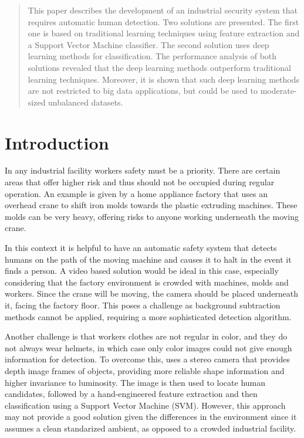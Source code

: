\begin{abstract}
This paper describes the development of an industrial security system that requires automatic human detection. Two solutions are presented. The first one is based on traditional learning techniques using feature extraction and a Support Vector Machine classifier. The second solution uses deep learning methods for classification. The performance analysis of both solutions revealed that the deep learning methods outperform traditional learning techniques. Moreover, it is shown that such deep learning methods are not restricted to big data applications, but could be used to moderate-sized unbalanced datasets.
\end{abstract}

\section{Introduction}
  In any industrial facility workers safety must be a priority. There are certain areas that offer higher risk and thus should not be occupied during regular operation. An example is given by a home appliance factory that uses an overhead crane to shift iron molds towards the plastic extruding machines. These molds can be very heavy, offering risks to anyone working underneath the moving crane.

  In this context it is helpful to have an automatic safety system that detects humans on the path of the moving machine and causes it to halt in the event it finds a person. A video based solution would be ideal in this case, especially considering that the factory environment is crowded with machines, molds and workers. Since the crane will be moving, the camera should be placed underneath it,  facing the factory floor. This poses a challenge as background subtraction methods cannot be applied, requiring a more sophisticated detection algorithm.

  Another challenge is that workers clothes are not regular in color, and they do not always wear helmets, in which case only color images could not give enough information for detection. To overcome this, \cite{rauter} uses a stereo camera that provides depth image frames of objects, providing more reliable shape information and higher invariance to luminosity. The image is then used to locate human candidates, followed by a hand-engineered feature extraction and then classification using a Support Vector Machine (SVM). However, this approach may not provide a good solution given the differences in the environment since it assumes a clean standarized ambient, as opposed to a crowded industrial facility.

